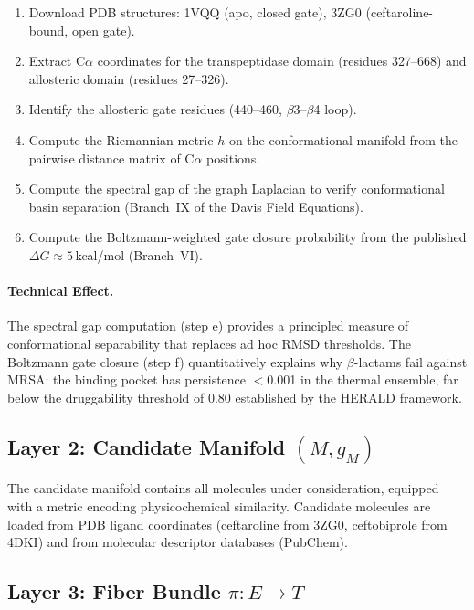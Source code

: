 \documentclass[11pt]{article}
\begin{document}
\begin{enumerate}[label=(\alph*), leftmargin=*]
    \item Download PDB structures: 1VQQ (apo, closed gate), 3ZG0 (ceftaroline-bound, open gate).
    \item Extract C$\alpha$ coordinates for the transpeptidase domain (residues 327--668)
    and allosteric domain (residues 27--326).
    \item Identify the allosteric gate residues (440--460, $\beta$3--$\beta$4 loop).
    \item Compute the Riemannian metric $h$ on the conformational manifold from the
    pairwise distance matrix of C$\alpha$ positions.
    \item Compute the spectral gap of the graph Laplacian to verify conformational basin
    separation (Branch~IX of the Davis Field Equations).
    \item Compute the Boltzmann-weighted gate closure probability from the published
    $\Delta G \approx 5$\,kcal/mol (Branch~VI).
\end{enumerate}

\paragraph{Technical Effect.}
The spectral gap computation (step e) provides a principled measure of conformational
separability that replaces ad hoc RMSD thresholds. The Boltzmann gate closure (step f)
quantitatively explains why $\beta$-lactams fail against MRSA: the binding pocket has
persistence $<$0.001 in the thermal ensemble, far below the druggability threshold of 0.80
established by the HERALD framework.

\subsection{Layer 2: Candidate Manifold $(M, g_M)$}

The candidate manifold contains all molecules under consideration, equipped with a metric
encoding physicochemical similarity. Candidate molecules are loaded from PDB ligand
coordinates (ceftaroline from 3ZG0, ceftobiprole from 4DKI) and from molecular descriptor
databases (PubChem).

\subsection{Layer 3: Fiber Bundle $\pi: E \to T$}
\end{document}
